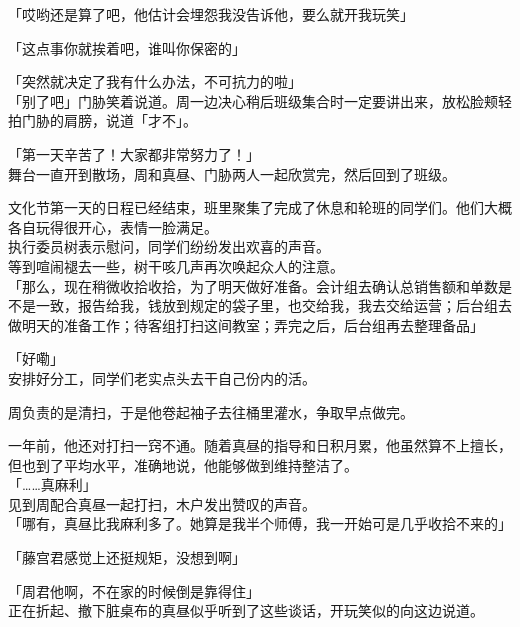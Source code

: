 「哎哟还是算了吧，他估计会埋怨我没告诉他，要么就开我玩笑」

「这点事你就挨着吧，谁叫你保密的」

「突然就决定了我有什么办法，不可抗力的啦」\\

「别了吧」门胁笑着说道。周一边决心稍后班级集合时一定要讲出来，放松脸颊轻拍门胁的肩膀，说道「才不」。\\

\vspace{2\baselineskip}

「第一天辛苦了！大家都非常努力了！」\\

舞台一直开到散场，周和真昼、门胁两人一起欣赏完，然后回到了班级。

文化节第一天的日程已经结束，班里聚集了完成了休息和轮班的同学们。他们大概各自玩得很开心，表情一脸满足。\\

执行委员树表示慰问，同学们纷纷发出欢喜的声音。\\

等到喧闹褪去一些，树干咳几声再次唤起众人的注意。\\

「那么，现在稍微收拾收拾，为了明天做好准备。会计组去确认总销售额和单数是不是一致，报告给我，钱放到规定的袋子里，也交给我，我去交给运营；后台组去做明天的准备工作；待客组打扫这间教室；弄完之后，后台组再去整理备品」

「好嘞」\\

安排好分工，同学们老实点头去干自己份内的活。

周负责的是清扫，于是他卷起袖子去往桶里灌水，争取早点做完。

一年前，他还对打扫一窍不通。随着真昼的指导和日积月累，他虽然算不上擅长，但也到了平均水平，准确地说，他能够做到维持整洁了。\\

「……真麻利」\\

见到周配合真昼一起打扫，木户发出赞叹的声音。\\

「哪有，真昼比我麻利多了。她算是我半个师傅，我一开始可是几乎收拾不来的」

「藤宫君感觉上还挺规矩，没想到啊」

「周君他啊，不在家的时候倒是靠得住」\\

正在折起、撤下脏桌布的真昼似乎听到了这些谈话，开玩笑似的向这边说道。\\

